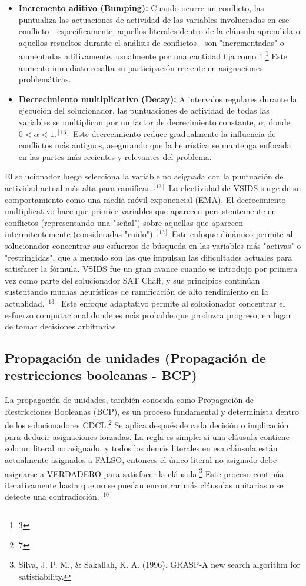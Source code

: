 \documentclass{article}
\begin{document}
\begin{itemize}
\item \textbf{Incremento aditivo (Bumping):} Cuando ocurre un conflicto, las puntualiza las actuaciones de actividad de las variables involucradas en ese conflicto---específicamente, aquellos literales dentro de la cláusula aprendida o aquellos resueltos durante el análisis de conflictos—son "incrementadas" o aumentadas aditivamente, usualmente por una cantidad fija como 1.\footnote{3} Este aumento inmediato resalta su participación reciente en asignaciones problemáticas.

\item \textbf{Decrecimiento multiplicativo (Decay):} A intervalos regulares durante la ejecución del solucionador, las puntuaciones de actividad de todas las variables se multiplican por un factor de decrecimiento constante, $\alpha$, donde $0 < \alpha < 1$.$^{[13]}$ Este decrecimiento reduce gradualmente la influencia de conflictos más antiguos, asegurando que la heurística se mantenga enfocada en las partes más recientes y relevantes del problema.
\end{itemize}

El solucionador luego selecciona la variable no asignada con la puntuación de actividad actual más alta para ramificar.$^{[13]}$ La efectividad de VSIDS surge de su comportamiento como una media móvil exponencial (EMA). El decrecimiento multiplicativo hace que priorice variables que aparecen persistentemente en conflictos (representando una "señal") sobre aquellas que aparecen intermitentemente (consideradas "ruido").$^{[13]}$ Este enfoque dinámico permite al solucionador concentrar sus esfuerzos de búsqueda en las variables más "activas" o "restringidas", que a menudo son las que impulsan las dificultades actuales para satisfacer la fórmula. VSIDS fue un gran avance cuando se introdujo por primera vez como parte del solucionador SAT Chaff, y sus principios continúan sustentando muchas heurísticas de ramificación de alto rendimiento en la actualidad.$^{[13]}$ Este enfoque adaptativo permite al solucionador concentrar el esfuerzo computacional donde es más probable que produzca progreso, en lugar de tomar decisiones arbitrarias.

\subsection{Propagación de unidades (Propagación de restricciones booleanas - BCP)}

La propagación de unidades, también conocida como Propagación de Restricciones Booleanas (BCP), es un proceso fundamental y determinista dentro de los solucionadores CDCL.\footnote{7} Se aplica después de cada decisión o implicación para deducir asignaciones forzadas. La regla es simple: si una cláusula contiene solo un literal no asignado, y todos los demás literales en esa cláusula están actualmente asignados a FALSO, entonces el único literal no asignado debe asignarse a VERDADERO para satisfacer la cláusula.\footnote{Silva, J. P. M., \& Sakallah, K. A. (1996). GRASP-A new search algorithm for satisfiability.} Este proceso continúa iterativamente hasta que no se puedan encontrar más cláusulas unitarias o se detecte una contradicción.$^{[10]}$
\end{document}
